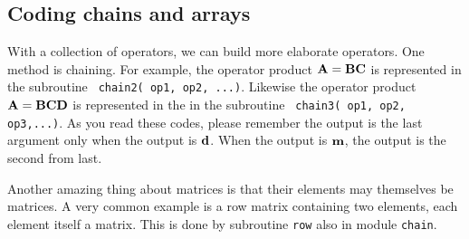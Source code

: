 %
%
%


\subsection{Coding chains and arrays}

With a collection of operators,
we can build more elaborate operators.
One method is chaining.
For example, the operator product
$\bold A = \bold B \bold C$
is represented in the subroutine 
\texttt{ chain2( op1, op2, ...)}.
Likewise the operator product
$\bold A = \bold B \bold C \bold D$
is represented in the in the subroutine 
\texttt{ chain3( op1, op2, op3,...)}.
As you read these codes, please remember the
output is the last argument only when the output is $\bold d$.
When the output is $\bold m$, the output is the second from last.
\par
Another amazing thing about matrices is that their elements
may themselves be matrices.
A very common example
is a row matrix containing two elements,
each element itself a matrix.
This is done by subroutine \texttt{row}
also in module \texttt{chain}.



